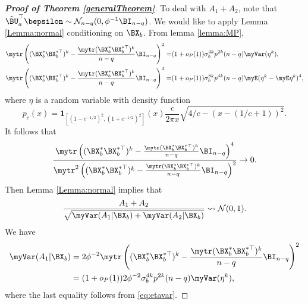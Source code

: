 \begin{proof}[\textbf{Proof of Theorem \ref{generalTheorem}}]
To deal with $A_1+A_2$,
note that $\tilde \BU_a^\top \bepsilon\sim \mathcal N_{n-q} (0, \phi^{-1} \BI_{n-q})$.
We would like to apply Lemma \ref{Lemma:normal} conditioning on $\BX_b$.
From lemma \ref{lemma:MP},
\begin{align}
    \mytr \left( (\BX_b^* \BX_b^{*\top})^{k} 
    -\frac{\mytr  (\BX_b^* \BX_b^{*\top})^{k}}{n-q} 
                \BI_{n-q}
        \right)^2
        =&(1+o_P(1))\sigma_b^{4k} p^{2k} (n-q) \myVar (\eta^k),
        \label{eq:etavar}
        \\
        \notag
    \mytr \left( (\BX_b^* \BX_b^{*\top})^{k} 
    -\frac{\mytr (\BX_b^* \BX_b^{*\top})^{k}}{n-q} 
                \BI_{n-q}
        \right)^4
        =&
        (1+o_P(1))\sigma_b^{8k} p^{4k} (n-q) \myE (\eta^k - \myE \eta^k)^4,
\end{align}
where $\eta$ is a random variable with density function
    \begin{equation*}
        p_{c}(x)=\mathbf{1}_{\left[(1-c^{-1/2})^2,(1+c^{-1/2})^2\right]}(x)
        \frac{c}{2\pi x} \sqrt{4/c - \left(x-(1/c+1)\right)^2}.
    \end{equation*}
    It follows that
\begin{equation*}
    \begin{split}
    \frac{
        \mytr \left( (\BX_b^* \BX_b^{*\top})^{k} 
    -\frac{\mytr  (\BX_b^* \BX_b^{*\top})^{k}}{n-q} 
                \BI_{n-q}
        \right)^4
    }
    {
    \mytr^2 \left( (\BX_b^* \BX_b^{*\top})^{k} 
    -\frac{\mytr (\BX_b^* \BX_b^{*\top})^{k}}{n-q} 
                \BI_{n-q}
        \right)^2
    }
    \to 0.
    \end{split}
\end{equation*}
Then Lemma \ref{Lemma:normal} implies that
\begin{equation}\label{eq:roughCLT}
    \frac{
        A_1+A_2
    }{\sqrt{
            \myVar(A_1| \BX_b)
            +
            \myVar(A_2| \BX_b)
    }} \rightsquigarrow \mathcal N(0,1).
\end{equation}
We have 
\begin{equation}\label{eq:varA1}
    \begin{split}
        \myVar (A_1|\BX_b)
        &=
        2\phi^{-2}
    \mytr \left( (\BX_b^* \BX_b^{*\top})^{k} 
    -\frac{\mytr  (\BX_b^* \BX_b^{*\top})^{k}}{n-q} 
                \BI_{n-q}
        \right)^2
        \\
        &=
(1+o_P(1))
2 \phi^{-2} \sigma_b^{4k} p^{2k} (n-q) \myVar(\eta^k)
                ,
                \\
    \end{split}
\end{equation}
where the last equality follows from \eqref{eq:etavar}.


\end{proof}
